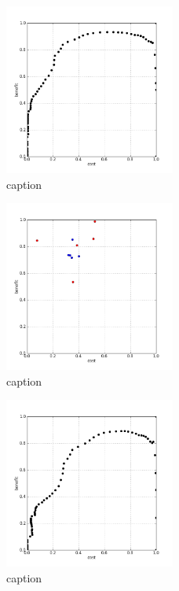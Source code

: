 %
\begin{figure}[!ht]
	\centering
	\includegraphics[width=0.5\textwidth]{img/p1figs/computeFrameStateCubic_sectionCompareBetter_smooth0_tol48_AUC.png}
	\caption{caption}
\end{figure}
%
\begin{figure}[!ht]
	\centering
	\includegraphics[width=0.5\textwidth]{img/p1figs/computeFrameStateCubic_sectionCompareBetter_smooth12_tol24.png}
	\caption{caption}
\end{figure}
%
\begin{figure}[!ht]
	\centering
	\includegraphics[width=0.5\textwidth]{img/p1figs/computeFrameStateCubic_sectionCompareBetter_smooth12_tol24_AUC.png}
	\caption{caption}
\end{figure}
